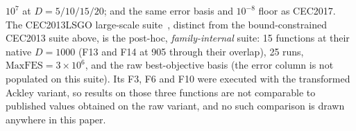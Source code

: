 $10^{7}$ at $D = 5/10/15/20$; and the same error basis and $10^{-8}$
floor as CEC2017.
The CEC2013LSGO large-scale suite~\cite{li2013lsgo}, distinct from
the bound-constrained CEC2013 suite above, is the post-hoc,
\emph{family-internal} suite: 15 functions at their native $D = 1000$
(F13 and F14 at 905 through their overlap), 25 runs,
$\mathrm{MaxFES} = 3 \times 10^{6}$, and the raw best-objective basis
(the error column is not populated on this suite). Its F3, F6 and F10
were executed with the transformed Ackley variant, so results on those
three functions are not comparable to published values obtained on the
raw variant, and no such comparison is drawn anywhere in this paper.

